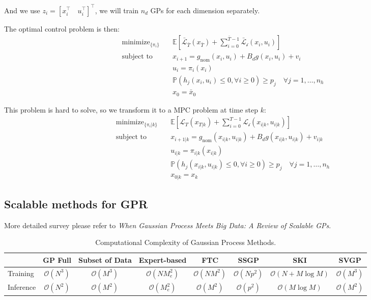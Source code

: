 \documentclass[10pt]{elegantbook}
\begin{document}
And we use $z_i = [x_i^{\top} \quad u_i^{\top}]^{\top}$, we will train $n_d$ GPs for each dimension separately.

The optimal control problem is then:
\begin{align}
    \text{minimize}_{\{\pi_i\}} \quad & \mathbb{E} \left[ \bar{\mathcal{L}}_{\bar T}(x_{\bar T}) + \sum_{i=0}^{\bar T-1} \mathcal{\bar L_i}(x_i, u_i) \right] \\
    \text{subject to} \quad & x_{i+1} = g_{\text{nom}}(x_i, u_i) + B_d g(x_i, u_i) + v_i \\
    & u_i = \pi_i(x_i) \\
    & \mathbb{P}(h_j(x_i, u_i) \leq 0, \forall i \geq 0) \geq p_j \quad \forall j=1,\ldots,n_h \\
    & x_0 = \bar{x}_0
\end{align}

This problem is hard to solve, so we transform it to a MPC problem at time step $k$:
\begin{align}
    \text{minimize}_{\{\pi_i | k\}} \quad & \mathbb{E} \left[ \mathcal{L}_{T}(x_{T|k}) + \sum_{i=0}^{T-1} \mathcal{L_i}(x_{i|k}, u_{i|k}) \right] \\
    \text{subject to} \quad & x_{i+1|k} = g_{\text{nom}}(x_{i|k}, u_{i|k}) + B_d g(x_{i|k}, u_{i|k}) + v_{i|k} \\
    & u_{i|k} = \pi_{i|k}(x_{i|k}) \\
    & \mathbb{P}(h_j(x_{i|k}, u_{i|k}) \leq 0, \forall i \geq 0) \geq p_j \quad \forall j=1,\ldots,n_h \\
    & x_{0|k} = x_k
\end{align}

\subsection{Scalable methods for GPR}
More detailed survey please refer to \textit{When Gaussian Process Meets Big Data: A Review of Scalable GPs}.

\begin{table}[ht]
\centering
\caption{Computational Complexity of Gaussian Process Methods.}
\begin{tabular}{lccccccc}
\toprule
& GP Full & Subset of Data & Expert-based & FTC & SSGP & SKI & SVGP \\
\midrule
Training  & $\mathcal O(N^3)$ & $\mathcal O(M^3)$ & $\mathcal O(NM_e^2)$ & $\mathcal O(NM^2)$ & $\mathcal O(Np^2)$ & $\mathcal O(N + M \log M)$ & $\mathcal O(M^3)$ \\
Inference & $\mathcal O(N^2)$ & $\mathcal O(M^2)$ & $\mathcal O(M_e^2)$  & $\mathcal O(M^2)$  & $\mathcal O(p^2)$  & $\mathcal O(M \log M)$     & $\mathcal O(M^2)$ \\
\bottomrule
\end{tabular}
\end{table}
\end{document}
